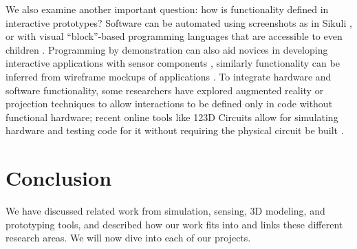     We also examine another important question: how is functionality defined in interactive prototypes? Software can be automated using screenshots as in Sikuli \cite{yeh-sikuli}, or with visual ``block''-based programming languages that are accessible to even children \cite{resnick-scratch}. Programming by demonstration can also aid novices in developing interactive applications with sensor components \cite{hartmann-dtools}, similarly functionality can be inferred from wireframe mockups of applications \cite{li-framewire}. To integrate hardware and software functionality, some researchers have explored augmented reality \cite{nam-AR} or projection \cite{akaoka-displayobjects} techniques to allow interactions to be defined only in code without functional hardware; recent online tools like 123D Circuits allow for simulating hardware and testing code for it without requiring the physical circuit be built \cite{123dcircuits}.
    
\section{Conclusion}

We have discussed related work from simulation, sensing, 3D modeling, and prototyping tools, and described how our work fits into and links these different research areas. We will now dive into each of our projects.